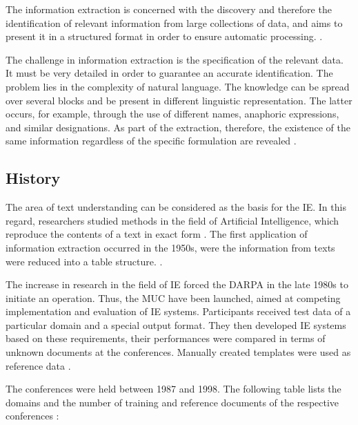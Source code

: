 
The information extraction is concerned with the discovery and therefore the identification of relevant information from large collections of data, and aims to present it in a structured format in order to ensure automatic processing. \cite{Lehnert:1994}\cite{Neumann:2001}\cite{Siefkes:2007}.

The challenge in information extraction is the specification of the relevant data. It must be very detailed in order to guarantee an accurate identification. The problem lies in the complexity of natural language. The knowledge can be spread over several blocks and be present in different linguistic representation. The latter occurs, for example, through the use of different names, anaphoric expressions, and similar designations. As part of the extraction, therefore, the existence of the same information regardless of the specific formulation are revealed \cite{Cole:1998}\cite{Grishman:2003}\cite{Grishman:2007}\cite{Linsmayr:2010}.

\newpage
\subsection{History}
The area of text understanding can be considered as the basis for the \gls{IE}. In this regard, researchers studied methods in the field of Artificial Intelligence, which reproduce the contents of a text in exact form \cite{Siefkes:2007}\cite{Eikvil:1999}. The first application of information extraction occurred in the 1950s, were  the information from texts  were reduced into a table structure. \cite{Grishman:1997}\cite{Gaizauskas:1998}\cite{Wilks:1997}.

The increase in research in the field of IE forced the \gls{DARPA} in the late 1980s to initiate an operation.  Thus, the \gls{MUC} have been launched, aimed at competing implementation and evaluation of IE systems. Participants received test data of a particular domain and a special output format. They then developed IE systems based on these requirements, their performances were compared in terms of unknown documents at the conferences. Manually created templates were used as reference data \cite{Grishman:1996}\cite{Grishman:1997}.

The conferences were held between 1987 and 1998. The following table lists the domains and the number of training and reference documents of the respective conferences \cite{Turmo:2006}\cite{Appelt:1999}\cite{Cunningham:2005}\cite{Linsmayr:2010}:

